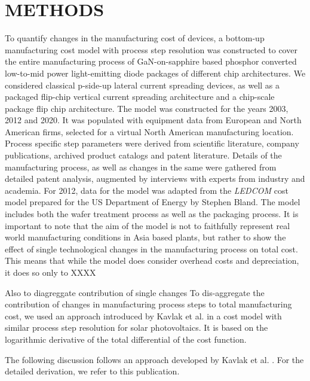 \documentclass[a4paper,nocompress]{spie}  %
\begin{document}
\clearpage

\section{METHODS}
\label{sec:methods}

To quantify changes in the manufacturing cost of devices, a bottom-up manufacturing cost model with process step resolution was constructed to cover the entire manufacturing process of GaN-on-sapphire based phosphor converted low-to-mid power light-emitting diode packages of different chip architectures. We considered classical p-side-up lateral current spreading devices, as well as a packaged flip-chip vertical current spreading architecture and a chip-scale package flip chip architecture. The model was constructed for the years 2003, 2012 and 2020. It was populated with equipment data from European and North American firms, selected for a virtual North American manufacturing location. Process specific step parameters were derived from scientific literature, company publications, archived product catalogs and patent literature. Details of the manufacturing process, as well as changes in the same were gathered from detailed patent analysis, augmented by interviews with experts from industry and academia. For 2012, data for the model was adapted from the \textit{LEDCOM} cost model prepared for the US Department of Energy by Stephen Bland. The model includes both the wafer treatment process as well as the packaging process. It is important to note that the aim of the model is not to faithfully represent real world manufacturing conditions in Asia based plants, but rather to show the effect of single technological changes in the manufacturing process on total cost. This means that while the model does consider overhead costs and depreciation, it does so only to XXXX 

Also to diagreggate contribution of single changes
To dis-aggregate the contribution of changes in manufacturing process steps to total manufacturing cost, we used an approach introduced by Kavlak et al. in a cost model with similar process step resolution for solar photovoltaics. It is based on the logarithmic derivative of the total differential of the cost function.

The following discussion follows an approach developed by Kavlak et al. \cite{kavlak2018evaluating}. For the detailed derivation, we refer to this publication.
\end{document}
